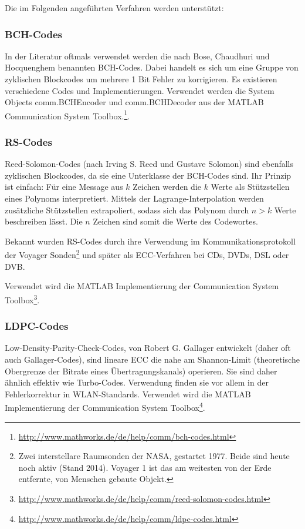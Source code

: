 Die im Folgenden angeführten Verfahren werden unterstützt:

\subsubsection{BCH-Codes}

In der Literatur\cite{chang2012location}\cite{huang2002blind} oftmals verwendet werden die nach Bose, Chaudhuri und Hocquenghem benannten BCH-Codes\cite{bose1960class}. Dabei handelt es sich um eine Gruppe von zyklischen Blockcodes um mehrere 1 Bit Fehler zu korrigieren. Es existieren verschiedene Codes und Implementierungen. Verwendet werden die System Objects \textsf{comm.BCHEncoder} und \textsf{comm.BCHDecoder} aus der MATLAB Communication System Toolbox.\footnote{\url{http://www.mathworks.de/de/help/comm/bch-codes.html}}.

\subsubsection{RS-Codes} 

Reed-Solomon-Codes\cite{reed1960polynomial} (nach Irving S. Reed und Gustave Solomon) sind ebenfalls zyklischen Blockcodes, da sie eine Unterklasse der BCH-Codes sind. Ihr Prinzip ist einfach: Für eine Message aus $k$ Zeichen werden die $k$ Werte als Stützstellen eines Polynoms interpretiert. Mittels der Lagrange-Interpolation werden zusätzliche Stützstellen extrapoliert, sodass sich das Polynom durch $n>k$ Werte beschreiben lässt. Die $n$ Zeichen sind somit die Werte des Codewortes.

Bekannt wurden RS-Codes durch ihre Verwendung im Kommunikationsprotokoll der Voyager Sonden\footnote{Zwei interstellare Raumsonden der NASA, gestartet 1977. Beide sind heute noch aktiv (Stand 2014). Voyager 1 ist das am weitesten von der Erde entfernte, von Menschen gebaute Objekt.} und später als ECC-Verfahren bei CDs, DVDs, DSL oder DVB. 

Verwendet wird die MATLAB Implementierung der Communication System Toolbox\footnote{\url{http://www.mathworks.de/de/help/comm/reed-solomon-codes.html}}.

\subsubsection{LDPC-Codes}

Low-Density-Parity-Check-Codes, von  Robert G. Gallager\cite{gallager1962low} entwickelt (daher oft auch Gallager-Codes), sind lineare ECC die nahe am Shannon-Limit (theoretische Obergrenze der Bitrate eines Übertragungskanals) operieren. Sie sind daher ähnlich effektiv wie Turbo-Codes. Verwendung finden sie vor allem in der Fehlerkorrektur in WLAN-Standards.
Verwendet wird die MATLAB Implementierung der Communication System Toolbox\footnote{\url{http://www.mathworks.de/de/help/comm/ldpc-codes.html}}.

